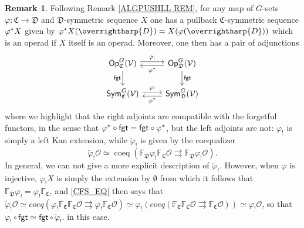 \documentclass[a4paper,10pt
,draft
]{article}%
\numberwithin{equation}{section}
\numberwithin{figure}{section}
\theoremstyle{definition} %
\newtheorem{remark}[equation]{Remark}%
\newcommand{\vect}[1]{\text{\overrightharp{\ensuremath{#1}}}}
\newcommand{\Sym}{\ensuremath{\mathsf{Sym}}}%
\newcommand{\Op}{\mathsf{Op}}%
\newcommand{\V}{\ensuremath{\mathcal V}}
\renewcommand{\O}{\ensuremath{\mathcal O}}
\newcommand{\1}{\ensuremath{\mathbbm 1}}%
\begin{document}
\begin{remark}\label{OP_MAP REM}
      Following Remark \ref{ALGPUSHLL REM},
      for any map of $G$-sets 
      $\varphi \colon \mathfrak C \to \mathfrak D$
      and $\mathfrak D$-symmetric sequence $X$
      one has a pullback $\mathfrak C$-symmetric sequence $\varphi^{\**}X$
      given by
      $\varphi^{\**}X(\vect D) = X(\varphi(\vect D))$
      which is an operad if $X$ itself is an operad.
      Moreover, one then has a pair of adjunctions 
\begin{equation}\label{GC_CHANGE_EQ}
\begin{tikzcd}
	\Op^G_{\mathfrak C}(\V) 
	\arrow[shift left]{r}{\check{\varphi}_!}
	\arrow[d, "\mathsf{fgt}"']
&
	\Op^G_{\mathfrak D}(\V) 
	\arrow[shift left]{l}{\varphi^{\**}}
	\arrow[d, "\mathsf{fgt}"]
\\
	\Sym^G_{\mathfrak C}(\V) 
	\arrow[shift left]{r}{\varphi_!}
&
	\Sym^G_{\mathfrak D}(\V) 
	\arrow[shift left]{l}{\varphi^{\**}}
\end{tikzcd}
\end{equation}
      where we highlight that
      the right adjoints are compatible with the forgetful functors, in the sense that 
      $\varphi^{\**} \circ \mathsf{fgt} = 
      \mathsf{fgt} \circ \varphi^{\**}$, 
      but the left adjoints are not:
      $\varphi_!$ is simply a left Kan extension, while $\check{\varphi}_!$ is given by the coequalizer
\begin{equation}\label{CFS_EQ}
	\check{\varphi}_! \O \simeq \mathop{coeq}(\mathbb F_{\mathfrak D} \varphi_! \mathbb F_{\mathfrak C}\O \rightrightarrows \mathbb F_{\mathfrak D} \varphi_! \O).
\end{equation}
	In general, we can not give a more explicit description of $\check{\varphi}_!$.
	However, when $\varphi$ is injective, $\varphi_!X$ is simply 
	the extension by $\emptyset$
	from which it follows that 
	$\mathbb F_{\mathfrak D} \varphi_! = \varphi_! \mathbb F_{\mathfrak C}$,
	and \eqref{CFS_EQ}
	then says that
	$\check{\varphi}_! \O
	\simeq
	coeq \left( \varphi_! \mathbb{F}_{\mathfrak{C}}  \mathbb{F}_{\mathfrak{C}} \O
		\rightrightarrows 
	\varphi_!  \mathbb{F}_{\mathfrak{C}} \O
	\right)
	\simeq 
	\varphi_! \left( coeq \left( 
	\mathbb{F}_{\mathfrak{C}}  \mathbb{F}_{\mathfrak{C}} \O
	\rightrightarrows 
	\mathbb{F}_{\mathfrak{C}} \O
	\right) \right)
	\simeq 
	\varphi_! \O$,
	so that  	
	$\varphi_! \circ \mathsf{fgt} \simeq 
	\mathsf{fgt} \circ \check{\varphi}_!$.
	in this case.
\end{remark}
\end{document}
